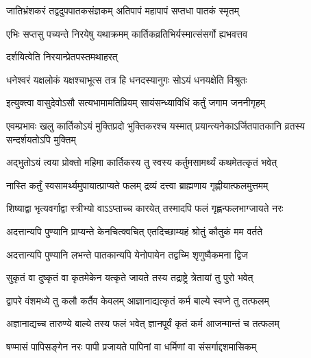 \twolineshloka
{जातिभ्रंशकरं तद्वदुपपातकसंज्ञकम्}
{अतिपापं महापापं सप्तधा पातकं स्मृतम्} %

\twolineshloka
{एभिः सप्तसु पच्यन्ते निरयेषु यथाक्रमम्}
{कार्तिकव्रतिभिर्यस्मात्संसर्गो ह्यभवत्तव} %




\onelineshloka
{दर्शयित्वेति निरयान्प्रेतपस्तमथाहरत्} %

\twolineshloka
{धनेश्वरं यक्षलोकं यक्षश्चाभूत्स तत्र हि}
{धनदस्यानुगः सोऽयं धनयक्षेति विश्रुतः} %


\twolineshloka
{इत्युक्त्वा वासुदेवोऽसौ सत्यभामामतिप्रियम्}
{सायंसन्ध्याविधिं कर्तुं जगाम जननीगृहम्} %


\twolineshloka
{एवम्प्रभावः खलु कार्तिकोऽयं मुक्तिप्रदो भुक्तिकरश्च यस्मात्}
{प्रयान्त्यनेकाऽर्जितपातकानि व्रतस्य सन्दर्शयतोऽपि मुक्तिम्} %





\twolineshloka
{अद्भुतोऽयं त्वया प्रोक्तो महिमा कार्तिकस्य तु}
{स्वस्य कर्तुमसामर्थ्यं कथमेतत्कृतं भवेत्} %


\twolineshloka
{नास्ति कर्तुं स्वसामर्थ्यमुपायात्प्राप्यते फलम्}
{द्रव्यं दत्त्वा ब्राह्मणाय गृह्णीयात्फलमुत्तमम्} %

\twolineshloka
{शिष्याद्वा भृत्यवर्गाद्वा स्त्रीभ्यो वाऽऽप्ताच्च कारयेत्}
{तस्मादपि फलं गृह्णन्फलभाग्जायते नरः} %


\twolineshloka
{अदत्तान्यपि पुण्यानि प्राप्यन्ते केनचित्क्वचित्}
{एतदिच्छाम्यहं श्रोतुं कौतुकं मम वर्तते} %


\twolineshloka
{अदत्तान्यपि पुण्यानि लभन्ते पातकान्यपि}
{येनोपायेन तद्वच्मि शृणुष्वैकमना द्विज} %

\twolineshloka
{सुकृतं वा दुष्कृतं वा कृतमेकेन यत्कृते}
{जायते तस्य तद्राष्ट्रे त्रेतायां तु पुरो भवेत्} %

\twolineshloka
{द्वापरे वंशमध्ये तु कलौ कर्तैव केवलम्}
{आज्ञानाद्यत्कृतं कर्म बाल्ये स्वप्ने तु तत्फलम्} %

\twolineshloka
{अज्ञानाद्यच्च तारुण्ये बाल्ये तस्य फलं भवेत्}
{ज्ञानपूर्वं कृतं कर्म आजन्मान्तं च तत्फलम्} %

\twolineshloka
{षण्मासं पापिसङ्गेन नरः पापी प्रजायते}
{पापिनां वा धर्मिणां वा संसर्गाद्दशमासिकम्} %

